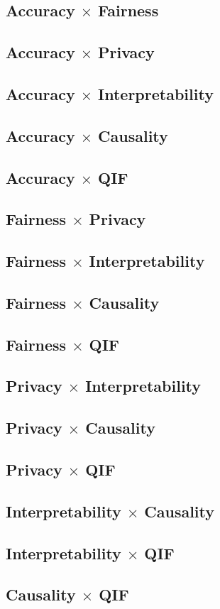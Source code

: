 \subsection{Accuracy $\times$ Fairness}

\subsection{Accuracy $\times$ Privacy}

\subsection{Accuracy $\times$ Interpretability}

\subsection{Accuracy $\times$ Causality}

\subsection{Accuracy $\times$ QIF}

\subsection{Fairness $\times$ Privacy}

\subsection{Fairness $\times$ Interpretability}

\subsection{Fairness $\times$ Causality}

\subsection{Fairness $\times$ QIF}

\subsection{Privacy $\times$ Interpretability}

\subsection{Privacy $\times$ Causality}

\subsection{Privacy $\times$ QIF}

\subsection{Interpretability $\times$ Causality}

\subsection{Interpretability $\times$ QIF}

\subsection{Causality $\times$ QIF}

